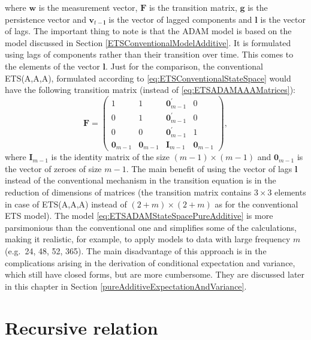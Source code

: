 \documentclass[
]{book}
\theoremstyle{definition}
\theoremstyle{definition}
\theoremstyle{definition}
\theoremstyle{definition}
\theoremstyle{remark}
\begin{document}
where \(\mathbf{w}\) is the measurement vector, \(\mathbf{F}\) is the transition matrix, \(\mathbf{g}\) is the persistence vector and \(\mathbf{v}_{t-\mathbf{l}}\) is the vector of lagged components and \(\mathbf{l}\) is the vector of lags. The important thing to note is that the ADAM model is based on the model discussed in Section \ref{ETSConventionalModelAdditive}. It is formulated using lags of components rather than their transition over time. This comes to the elements of the vector \(\mathbf{l}\). Just for the comparison, the conventional ETS(A,A,A), formulated according to \eqref{eq:ETSConventionalStateSpace} would have the following transition matrix (instead of \eqref{eq:ETSADAMAAAMatrices}):
\begin{equation}
  \mathbf{F} = \begin{pmatrix} 1 & 1 & \mathbf{0}^\prime_{m-1} & 0 \\ 0 & 1 & \mathbf{0}^\prime_{m-1} & 0 \\ 0 & 0 & \mathbf{0}^\prime_{m-1} & 1 \\ \mathbf{0}_{m-1} & \mathbf{0}_{m-1} & \mathbf{I}_{m-1} & \mathbf{0}_{m-1} \end{pmatrix},
  \label{eq:ETSADAMAAAMatricesTransition}
\end{equation}
where \(\mathbf{I}_{m-1}\) is the identity matrix of the size \((m-1) \times (m-1)\) and \(\mathbf{0}_{m-1}\) is the vector of zeroes of size \(m-1\). The main benefit of using the vector of lags \(\mathbf{l}\) instead of the conventional mechanism in the transition equation is in the reduction of dimensions of matrices (the transition matrix contains \(3\times 3\) elements in case of ETS(A,A,A) instead of \((2+m)\times (2+m)\) as for the conventional ETS model). The model \eqref{eq:ETSADAMStateSpacePureAdditive} is more parsimonious than the conventional one and simplifies some of the calculations, making it realistic, for example, to apply models to data with large frequency \(m\) (e.g.~24, 48, 52, 365). The main disadvantage of this approach is in the complications arising in the derivation of conditional expectation and variance, which still have closed forms, but are more cumbersome. They are discussed later in this chapter in Section \ref{pureAdditiveExpectationAndVariance}.

\hypertarget{adamETSPureAdditiveRecursive}{%
\section{Recursive relation}\label{adamETSPureAdditiveRecursive}}
\end{document}
